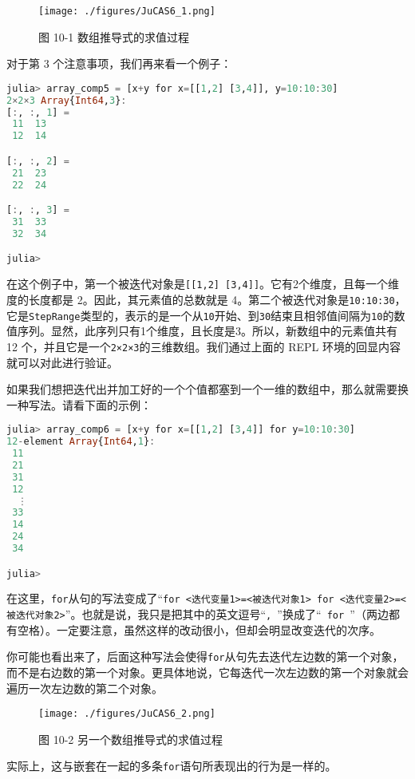 \begin{figure}[ht]
\centering
\texttt{[image: ./figures/JuCAS6\_1.png]}
\caption{图 10-1 数组推导式的求值过程} \label{JuCAS6_fig1}
\end{figure}

对于第 3 个注意事项，我们再来看一个例子：

\begin{lstlisting}[language=julia]
julia> array_comp5 = [x+y for x=[[1,2] [3,4]], y=10:10:30]
2×2×3 Array{Int64,3}:
[:, :, 1] =
 11  13
 12  14

[:, :, 2] =
 21  23
 22  24

[:, :, 3] =
 31  33
 32  34

julia> 
\end{lstlisting}

在这个例子中，第一个被迭代对象是\verb|[[1,2] [3,4]]|。它有2个维度，且每一个维度的长度都是 2。因此，其元素值的总数就是 4。第二个被迭代对象是\verb|10:10:30|，它是\verb|StepRange|类型的，表示的是一个从\verb|10|开始、到\verb|30|结束且相邻值间隔为\verb|10|的数值序列。显然，此序列只有1个维度，且长度是3。所以，新数组中的元素值共有 12 个，并且它是一个\verb|2×2×3|的三维数组。我们通过上面的 REPL 环境的回显内容就可以对此进行验证。

如果我们想把迭代出并加工好的一个个值都塞到一个一维的数组中，那么就需要换一种写法。请看下面的示例：

\begin{lstlisting}[language=julia]
julia> array_comp6 = [x+y for x=[[1,2] [3,4]] for y=10:10:30]
12-element Array{Int64,1}:
 11
 21
 31
 12
  ⋮
 33
 14
 24
 34

julia> 
\end{lstlisting}

在这里，\verb|for|从句的写法变成了“\verb|for <迭代变量1>=<被迭代对象1> for <迭代变量2>=<被迭代对象2>|”。也就是说，我只是把其中的英文逗号“\verb|, |”换成了“\verb| for |”（两边都有空格）。一定要注意，虽然这样的改动很小，但却会明显改变迭代的次序。

你可能也看出来了，后面这种写法会使得\verb|for|从句先去迭代左边数的第一个对象，而不是右边数的第一个对象。更具体地说，它每迭代一次左边数的第一个对象就会遍历一次左边数的第二个对象。

\begin{figure}[ht]
\centering
\texttt{[image: ./figures/JuCAS6\_2.png]}
\caption{图 10-2 另一个数组推导式的求值过程} \label{JuCAS6_fig2}
\end{figure}

实际上，这与嵌套在一起的多条\verb|for|语句所表现出的行为是一样的。

